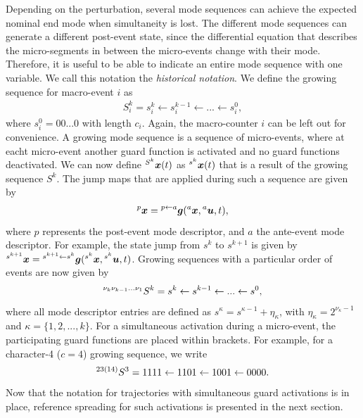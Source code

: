 \documentclass[../DC2017114Bouma.tex]{subfiles}
\begin{document}
Depending on the perturbation, several mode sequences can achieve the expected nominal end mode when simultaneity is lost. The different mode sequences can generate a different post-event state, since the differential equation that describes the micro-segments in between the micro-events change with their mode. Therefore, it is useful to be able to indicate an entire mode sequence with one variable. We call this notation the \textit{historical notation}. We define the growing sequence for macro-event $i$ as 
\begin{align}
S^k_i = s^k_i\leftarrow s^{k-1}_i\leftarrow ... \leftarrow s^0_i,
\end{align}
where $s^0_i = 00...0$ with length $c_i$. Again, the macro-counter $i$ can be left out for convenience. A growing mode sequence is a sequence of micro-events, where at eacht micro-event another guard function is activated and no guard functions deactivated. We can now define $\hspace{0cm}^{S^k}{\boldsymbol{x}}(t)$ as $\hspace{0cm}^{s^k}{\boldsymbol{x}}(t)$ that is a result of the growing sequence $S^k$. The jump maps that are applied during such a sequence are given by
\begin{align}
\hspace{0cm}^{p}{\boldsymbol{x}} = \hspace{0cm}^{p\leftarrow a}{\boldsymbol{g}}(\hspace{0cm}^{a}{\boldsymbol{x}},\hspace{0cm}^{a}{\boldsymbol{u}},t),
\end{align}
where $p$ represents the post-event mode descriptor, and $a$ the ante-event mode descriptor. For example, the state jump from $s^k$ to $s^{k+1}$ is given by $\hspace{0cm}^{s^{k+1}}{\boldsymbol{x}} = \hspace{0cm}^{s^{k+1}\leftarrow s^k}{\boldsymbol{g}}(\hspace{0cm}^{s^k}{\boldsymbol{x}},\hspace{0cm}^{s^k}{\boldsymbol{u}},t)$. Growing sequences with a particular order of events are now given by
\begin{align}
\hspace{0cm}^{\nu_k \nu_{k-1}...\nu_{1}}S^k = s^k \leftarrow s^{k-1} \leftarrow ... \leftarrow s^0,
\end{align}
where all mode descriptor entries are defined as $s^{\kappa} = s^{\kappa-1} + \eta_{\kappa}$, with $\eta_{\kappa} = 2^{\nu_{\kappa}-1}$ and $\kappa = \{1,2,...,k\}$. For a simultaneous activation during a micro-event, the participating guard functions are placed within brackets. For example, for a character-4 ($c = 4$) growing sequence, we write 
\begin{align}
\hspace{0cm}^{23(14)}S^3 = 1111 \leftarrow 1101 \leftarrow 1001 \leftarrow 0000.
\end{align}
%
Now that the notation for trajectories with simultaneous guard activations is in place, reference spreading for such activations is presented in the next section.
\end{document}
